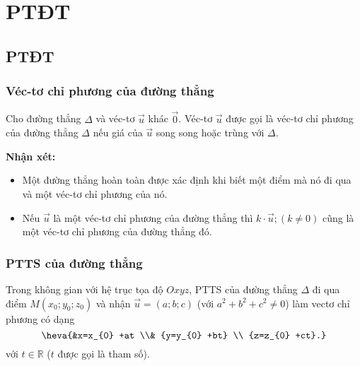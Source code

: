 \section{PTĐT}

\subsection{PTĐT}

\subsubsection{Véc-tơ chỉ phương của đường thẳng}
 Cho đường thẳng $\Delta $ và véc-tơ $\overrightarrow{u}$ khác $\overrightarrow{0}$. Véc-tơ $\overrightarrow{u}$ được gọi là véc-tơ chỉ phương của đường thẳng $\Delta $ nếu giá của $\overrightarrow{u}$ song song hoặc trùng với $\Delta $.
 \begin{center}
\end{center}
 \textbf{Nhận xét:}
\begin{itemize}
	\item  Một đường thẳng hoàn toàn được xác định khi biết một điểm mà nó đi qua và một véc-tơ chỉ phương của nó.
	\item  Nếu $\overrightarrow{u}$ là một véc-tơ chỉ phương của đường thẳng thì $k\cdot\overrightarrow{u}; (k\ne 0)$ cũng là một véc-tơ chỉ phương của đường thẳng đó.
\end{itemize}

\subsubsection{PTTS của đường thẳng}

 Trong không gian với hệ trục tọa độ $Oxyz$, PTTS của đường thẳng $\Delta $ đi qua điểm $M(x_{0} ;y_{0} ;z_{0} )$ và nhận $\overrightarrow{u}=(a;b;c)$ (với $a^{2} +b^{2} +c^{2} \ne 0$) làm vectơ chỉ phương có dạng
 $$\heva{&x=x_{0} +at \\& {y=y_{0} +bt} \\ {z=z_{0} +ct}.} $$   với $t\in  \mathbb{R}$ ($t$ được gọi là tham số).
\begin{center}
\end{center}

